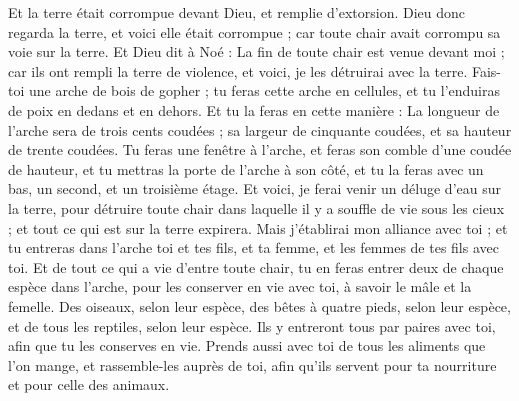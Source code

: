 \begin{multicols}{2}
Et la terre était corrompue devant Dieu, et remplie d'extorsion.
Dieu donc regarda la terre, et voici elle était corrompue ; car toute chair avait corrompu sa voie sur la terre.
Et Dieu dit à Noé : La fin de toute chair est venue devant moi ; car ils ont rempli la terre de violence, et voici, je les détruirai avec la terre.
Fais-toi une arche de bois de gopher ; tu feras cette arche en cellules, et tu l’enduiras de poix en dedans et en dehors.
Et tu la feras en cette manière : La longueur de l'arche sera de trois cents coudées ; sa largeur de cinquante coudées, et sa hauteur de trente coudées.
Tu feras une fenêtre à l'arche, et feras son comble d'une coudée de hauteur, et tu mettras la porte de l'arche à son côté, et tu la feras avec un bas, un second, et un troisième étage.
Et voici, je ferai venir un déluge d'eau sur la terre, pour détruire toute chair dans laquelle il y a souffle de vie sous les cieux ; et tout ce qui est sur la terre expirera.
Mais j'établirai mon alliance avec toi ; et tu entreras dans l'arche toi et tes fils, et ta femme, et les femmes de tes fils avec toi.
Et de tout ce qui a vie d'entre toute chair, tu en feras entrer deux de chaque espèce dans l'arche, pour les conserver en vie avec toi, à savoir le mâle et la femelle.
Des oiseaux, selon leur espèce, des bêtes à quatre pieds, selon leur espèce, et de tous les reptiles, selon leur espèce. Ils y entreront tous par paires avec toi, afin que tu les conserves en vie.
Prends aussi avec toi de tous les aliments que l’on mange, et rassemble-les auprès de toi, afin qu'ils servent pour ta nourriture et pour celle des animaux.

\end{multicols}
